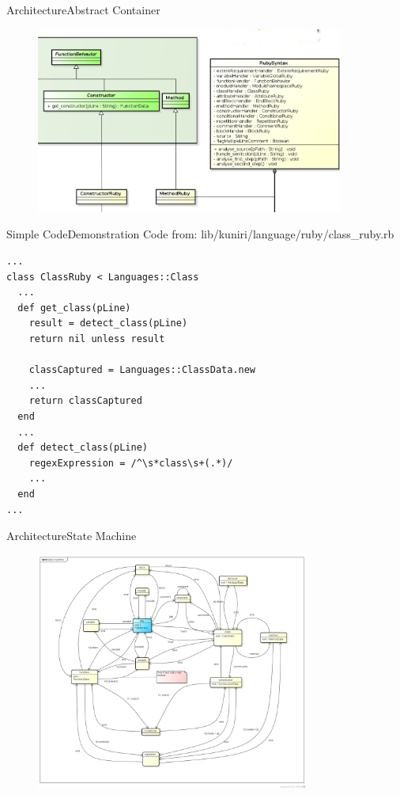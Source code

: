 \documentclass[10pt]{beamer}
\begin{document}
\begin{frame}{Architecture}{Abstract Container}
  \begin{figure}[overview]
    \includegraphics[width=0.9\textwidth]{images/abstractContainerConcrete.png}
  \end{figure}
\end{frame}

\begin{frame}[fragile]{Simple Code}{Demonstration}
Code from: lib/kuniri/language/ruby/class\_ruby.rb
\small
\begin{lstlisting}
...
class ClassRuby < Languages::Class
  ...
  def get_class(pLine)
    result = detect_class(pLine)
    return nil unless result

    classCaptured = Languages::ClassData.new
    ...
    return classCaptured
  end
  ...
  def detect_class(pLine)
    regexExpression = /^\s*class\s+(.*)/
    ...
  end
...
\end{lstlisting}
\end{frame}

\begin{frame}{Architecture}{State Machine}
  \begin{figure}[All]
    \includegraphics[width=0.8\textwidth]{images/fsm.png}
  \end{figure}
\end{frame}
\end{document}
